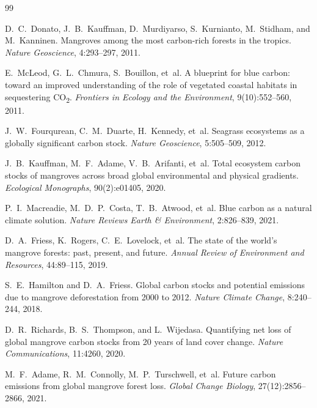 \begin{thebibliography}{99}

D.~C.~Donato, J.~B.~Kauffman, D.~Murdiyarso, S.~Kurnianto, M.~Stidham, and M.~Kanninen.
\newblock Mangroves among the most carbon-rich forests in the tropics.
\newblock \emph{Nature Geoscience}, 4:293--297, 2011.

E.~McLeod, G.~L.~Chmura, S.~Bouillon, et~al.
\newblock A blueprint for blue carbon: toward an improved understanding of the role of vegetated coastal habitats in sequestering CO\textsubscript{2}.
\newblock \emph{Frontiers in Ecology and the Environment}, 9(10):552--560, 2011.

J.~W.~Fourqurean, C.~M.~Duarte, H.~Kennedy, et~al.
\newblock Seagrass ecosystems as a globally significant carbon stock.
\newblock \emph{Nature Geoscience}, 5:505--509, 2012.

J.~B.~Kauffman, M.~F.~Adame, V.~B.~Arifanti, et~al.
\newblock Total ecosystem carbon stocks of mangroves across broad global environmental and physical gradients.
\newblock \emph{Ecological Monographs}, 90(2):e01405, 2020.

P.~I.~Macreadie, M.~D.~P.~Costa, T.~B.~Atwood, et~al.
\newblock Blue carbon as a natural climate solution.
\newblock \emph{Nature Reviews Earth \& Environment}, 2:826--839, 2021.

D.~A.~Friess, K.~Rogers, C.~E.~Lovelock, et~al.
\newblock The state of the world's mangrove forests: past, present, and future.
\newblock \emph{Annual Review of Environment and Resources}, 44:89--115, 2019.

S.~E.~Hamilton and D.~A.~Friess.
\newblock Global carbon stocks and potential emissions due to mangrove deforestation from 2000 to 2012.
\newblock \emph{Nature Climate Change}, 8:240--244, 2018.

D.~R.~Richards, B.~S.~Thompson, and L.~Wijedasa.
\newblock Quantifying net loss of global mangrove carbon stocks from 20 years of land cover change.
\newblock \emph{Nature Communications}, 11:4260, 2020.

M.~F.~Adame, R.~M.~Connolly, M.~P.~Turschwell, et~al.
\newblock Future carbon emissions from global mangrove forest loss.
\newblock \emph{Global Change Biology}, 27(12):2856--2866, 2021.


\end{thebibliography}
